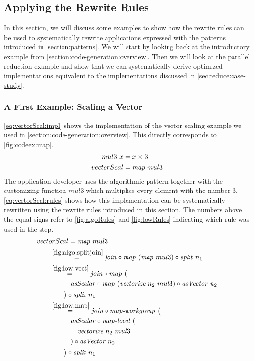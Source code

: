 \subsection{Applying the Rewrite Rules}
\label{sec:example}
In this section, we will discuss some examples to show how the rewrite rules can be used to systematically rewrite applications expressed with the patterns introduced in \autoref{section:patterns}.
We will start by looking back at the introductory example from \autoref{section:code-generation:overview}.
Then we will look at the parallel reduction example and show that we can systematically derive optimized implementations equivalent to the implementations discussed in \autoref{sec:reduce:case-study}.

\subsubsection{A First Example: Scaling a Vector}
\autoref{eq:vectorScal:impl} shows the implementation of the vector scaling example we used in \autoref{section:code-generation:overview}.
This directly corresponds to \autoref{fig:codeex:map}.
\begin{align}
  mul3\ x &= x \times 3\nonumber\\
  vectorScal &= \text{\textit{map}}\ mul3
  \label{eq:vectorScal:impl}
\end{align}
The application developer uses the algorithmic pattern \map together with the customizing function $mul3$ which multiplies every element with the number $3$.
\autoref{eq:vectorScal:rules} shows how this implementation can be systematically rewritten using the rewrite rules introduced in this section.
The numbers above the equal signs refer to \autoref{fig:algoRules} and \autoref{fig:lowRules} indicating which rule was used in the step.
\begin{align}
  &vectorScal = \text{\textit{map}}\ mul3\nonumber\\
  &\qquad\begin{aligned}
    &\overset{\ref{fig:algo:splitjoin}}{=\hspace{.2em}}
      \text{\textit{join}} \circ \text{\textit{map}}\ (\text{\textit{map}}\ mul3) \circ \text{\textit{split}}\ n_1\\
    &\overset{\ref{fig:low:vect}}{=\hspace{.2em}}
      \text{\textit{join}} \circ \text{\textit{map}}\ \big(\\
      &\qquad\quad \text{\textit{asScalar}} \circ \text{\textit{map}}\ (\text{\textit{vectorize}}\ n_2\ mul3) \circ \text{\textit{asVector}}\ n_2\\
      &\qquad\big) \circ \text{\textit{split}}\ n_1\\
    &\overset{\ref{fig:low:map}}{=\hspace{.2em}}
      \text{\textit{join}} \circ \text{\textit{map-workgroup}}\ \big(\\
      &\qquad\quad \text{\textit{asScalar}} \circ \text{\textit{map-local}}\ (\\
      &\qquad\qquad\text{\textit{vectorize}}\ n_2\ mul3\\
      &\qquad\quad) \circ \text{\textit{asVector}}\ n_2\\
      &\qquad\big) \circ \text{\textit{split}}\ n_1
  \end{aligned}
  \label{eq:vectorScal:rules}
\end{align}
